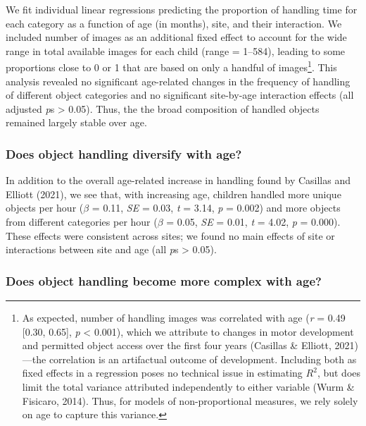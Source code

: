 \documentclass[10pt, letterpaper]{article}
\begin{document}
We fit individual linear regressions predicting the proportion of
handling time for each category as a function of age (in months), site,
and their interaction. We included number of images as an additional
fixed effect to account for the wide range in total available images for
each child (range = 1--584), leading to some proportions close to 0 or 1
that are based on only a handful of images\footnote{As expected, number
  of handling images was correlated with age (\emph{r} = 0.49 {[}0.30,
  0.65{]}, \emph{p} \textless{} 0.001), which we attribute to changes in
  motor development and permitted object access over the first four
  years (Casillas \& Elliott, 2021)---the correlation is an artifactual
  outcome of development. Including both as fixed effects in a
  regression poses no technical issue in estimating \(R^{2}\), but does
  limit the total variance attributed independently to either variable
  (Wurm \& Fisicaro, 2014). Thus, for models of non-proportional
  measures, we rely solely on age to capture this variance.}. This
analysis revealed no significant age-related changes in the frequency of
handling of different object categories and no significant site-by-age
interaction effects (all adjusted \emph{p}s \textgreater{} 0.05). Thus,
the the broad composition of handled objects remained largely stable
over age.

\hypertarget{does-object-handling-diversify-with-age}{%
\subsubsection{Does object handling diversify with
age?}\label{does-object-handling-diversify-with-age}}

In addition to the overall age-related increase in handling found by
Casillas and Elliott (2021), we see that, with increasing age, children
handled more unique objects per hour (\(\beta\) = 0.11, \emph{SE} =
0.03, \emph{t} = 3.14, \emph{p} = 0.002) and more objects from different
categories per hour (\(\beta\) = 0.05, \emph{SE} = 0.01, \emph{t} =
4.02, \emph{p} = 0.000). These effects were consistent across sites; we
found no main effects of site or interactions between site and age (all
\emph{p}s \textgreater{} 0.05).

\hypertarget{does-object-handling-become-more-complex-with-age}{%
\subsubsection{Does object handling become more complex with
age?}\label{does-object-handling-become-more-complex-with-age}}
\end{document}

